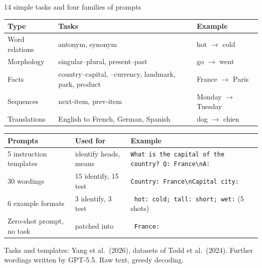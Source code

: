 \documentclass[aspectratio=169,11pt,xcolor=table]{beamer}
\newcommand{\gnote}[1]{{\footnotesize\color{gray}#1}}
\newcommand{\nl}{\textbackslash n}
\begin{document}
\begin{frame}{14 simple tasks and four families of prompts}
\centering\small
\begin{tabular}{@{}lll@{}}
\toprule
Type & Tasks & Example \\
\midrule
Word relations & antonym, synonym & hot $\rightarrow$ cold \\
Morphology & singular--plural, present--past & go $\rightarrow$ went \\
Facts & country--capital, --currency, landmark, park, product & France $\rightarrow$ Paris \\
Sequences & next-item, prev-item & Monday $\rightarrow$ Tuesday \\
Translations & English to French, German, Spanish & dog $\rightarrow$ chien \\
\bottomrule
\end{tabular}

\vspace{0.8em}
\footnotesize
\begin{tabular}{@{}lll@{}}
\toprule
Prompts & Used for & Example \\
\midrule
5 instruction templates & identify heads, means & \texttt{\scriptsize What is the capital of the country? Q: France\nl A:} \\
30 wordings & 15 identify, 15 test & \texttt{\scriptsize Country: France\nl Capital city:} \\
6 example formats & 3 identify, 3 test & \texttt{\scriptsize \ hot: cold; tall: short; wet:} \quad (5 shots) \\
Zero-shot prompt, no task & patched into & \texttt{\scriptsize \ France:} \\
\bottomrule
\end{tabular}

\vfill
\raggedright
\gnote{Tasks and templates: Yang et al.\ (2026), datasets of Todd et al.\ (2024). Further wordings written by GPT-5.5.
Raw text, greedy decoding.}
\end{frame}
\end{document}
